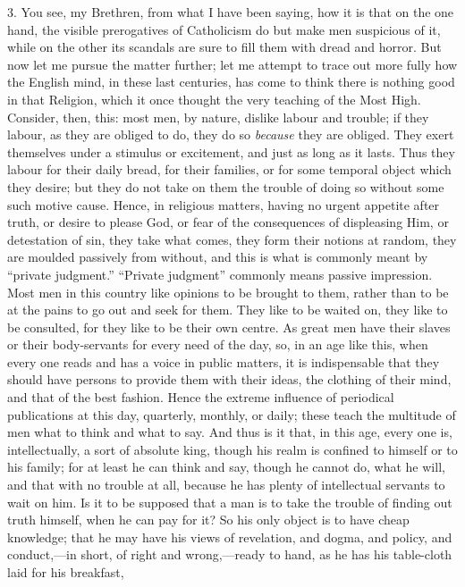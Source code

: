 3. You see, my Brethren, from what I have been saying,
how it is that on the one hand, the visible prerogatives
of Catholicism do but make men suspicious of it, while on
the other its scandals are sure to fill them with dread
and horror. But now let me pursue the matter further; let
me attempt to trace out more fully how the English mind,
in these last centuries, has come to think there is
nothing good in that Religion, which it once thought the
very teaching of the Most High. Consider, then, this:
most men, by nature, dislike labour and trouble; if they
labour, as they are obliged to do, they do so \emph{because}
they are obliged. They exert themselves under a stimulus
or excitement, and just as long as it lasts. Thus they
labour for their daily bread, for their families, or for
some temporal object which they desire; but they do not
take on them the trouble of doing so without some such
motive cause. Hence, in religious matters, having no
urgent appetite after truth, or desire to please God, or
fear of the consequences of displeasing Him, or
detestation of sin, they take what comes, they form their
notions at random, they are moulded passively from
without, and this is what is commonly meant by
``private judgment.'' ``Private
judgment'' commonly means passive impression. Most
men in this country like opinions to be brought to them,
rather than to be at the pains to go out and seek for
them. They like to be waited on, they like to be
consulted, for they like to be their own centre. As great
men have their slaves or their body-servants for every
need of the day, so, in an age like this, when every one
reads and has a voice in public matters, it is
indispensable that they should have persons to provide
them with their ideas, the clothing of their mind, and
that of the best fashion. Hence the extreme influence of
periodical publications at this day, quarterly, monthly,
or daily; these teach the multitude of men what to think
and what to say. And thus is it that, in this age, every
one is, intellectually, a sort of absolute king, though
his realm is confined to himself or to his family; for at
least he can think and say, though he cannot do, what he
will, and that with no trouble at all, because he has
plenty of intellectual servants to wait on him. Is it to
be supposed that a man is to take the trouble of finding
out truth himself, when he can pay for it? So his only
object is to have cheap knowledge; that he may have his
views of revelation, and dogma, and policy, and
conduct,—in short, of right and wrong,—ready to
hand, as he has his table-cloth laid for his breakfast,
